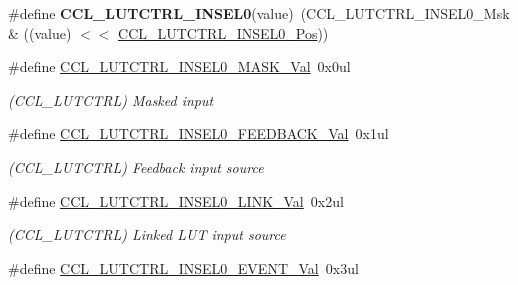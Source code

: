 \begin{DoxyCompactItemize}
\item 
\hypertarget{group___s_a_m_l21___c_c_l_ga2a479a808c5657571e1d2d4ac99266c8}{}\#define {\bfseries C\+C\+L\+\_\+\+L\+U\+T\+C\+T\+R\+L\+\_\+\+I\+N\+S\+E\+L0}(value)~(C\+C\+L\+\_\+\+L\+U\+T\+C\+T\+R\+L\+\_\+\+I\+N\+S\+E\+L0\+\_\+\+Msk \& ((value) $<$$<$ \hyperlink{group___s_a_m_l21___c_c_l_gae20b08aa5e8fcd9eb3a1a118441de53d}{C\+C\+L\+\_\+\+L\+U\+T\+C\+T\+R\+L\+\_\+\+I\+N\+S\+E\+L0\+\_\+\+Pos}))\label{group___s_a_m_l21___c_c_l_ga2a479a808c5657571e1d2d4ac99266c8}

\item 
\hypertarget{group___s_a_m_l21___c_c_l_ga2fc3f172fd108a2ac9808430a8ac1637}{}\#define \hyperlink{group___s_a_m_l21___c_c_l_ga2fc3f172fd108a2ac9808430a8ac1637}{C\+C\+L\+\_\+\+L\+U\+T\+C\+T\+R\+L\+\_\+\+I\+N\+S\+E\+L0\+\_\+\+M\+A\+S\+K\+\_\+\+Val}~0x0ul\label{group___s_a_m_l21___c_c_l_ga2fc3f172fd108a2ac9808430a8ac1637}

\begin{DoxyCompactList}\small\item\em (C\+C\+L\+\_\+\+L\+U\+T\+C\+T\+R\+L) Masked input \end{DoxyCompactList}\item 
\hypertarget{group___s_a_m_l21___c_c_l_gaedcfd4d1e7166bb561c19c59b9efb08f}{}\#define \hyperlink{group___s_a_m_l21___c_c_l_gaedcfd4d1e7166bb561c19c59b9efb08f}{C\+C\+L\+\_\+\+L\+U\+T\+C\+T\+R\+L\+\_\+\+I\+N\+S\+E\+L0\+\_\+\+F\+E\+E\+D\+B\+A\+C\+K\+\_\+\+Val}~0x1ul\label{group___s_a_m_l21___c_c_l_gaedcfd4d1e7166bb561c19c59b9efb08f}

\begin{DoxyCompactList}\small\item\em (C\+C\+L\+\_\+\+L\+U\+T\+C\+T\+R\+L) Feedback input source \end{DoxyCompactList}\item 
\hypertarget{group___s_a_m_l21___c_c_l_ga96dd3c1ff426f4ef5a004d6259fff801}{}\#define \hyperlink{group___s_a_m_l21___c_c_l_ga96dd3c1ff426f4ef5a004d6259fff801}{C\+C\+L\+\_\+\+L\+U\+T\+C\+T\+R\+L\+\_\+\+I\+N\+S\+E\+L0\+\_\+\+L\+I\+N\+K\+\_\+\+Val}~0x2ul\label{group___s_a_m_l21___c_c_l_ga96dd3c1ff426f4ef5a004d6259fff801}

\begin{DoxyCompactList}\small\item\em (C\+C\+L\+\_\+\+L\+U\+T\+C\+T\+R\+L) Linked L\+U\+T input source \end{DoxyCompactList}\item 
\hypertarget{group___s_a_m_l21___c_c_l_ga16ec41d6b721dada46dd341a50c2559c}{}\#define \hyperlink{group___s_a_m_l21___c_c_l_ga16ec41d6b721dada46dd341a50c2559c}{C\+C\+L\+\_\+\+L\+U\+T\+C\+T\+R\+L\+\_\+\+I\+N\+S\+E\+L0\+\_\+\+E\+V\+E\+N\+T\+\_\+\+Val}~0x3ul\label{group___s_a_m_l21___c_c_l_ga16ec41d6b721dada46dd341a50c2559c}


\end{DoxyCompactItemize}
